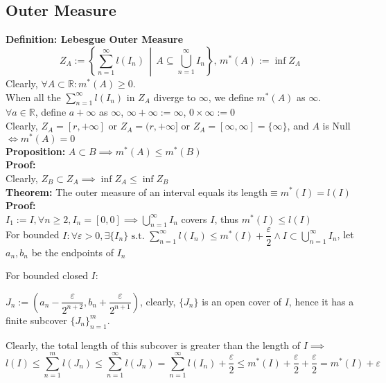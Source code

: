 \documentclass{article}
\newcommand{\R}{\mathbb{R}}
\newcommand{\sumninf}{\displaystyle\sum_{n=1}^\infty}
\newcommand{\infcup}{\displaystyle\bigcup_{n=1}^\infty}
\newcommand{\st}{\mbox{ s.t. }}
\newcommand{\0}{{\bf{0}}}
\newcommand{\1}{{\bf{1}}}
\begin{document}
\subsection{Outer Measure}
\textbf{Definition: Lebesgue Outer Measure}
$$Z_A:=\left\{\sum_{n=1}^\infty l(I_n)\,\middle\vert\,A\subseteq\bigcup_{n=1}^\infty I_n\right\},\,m^*(A):=\inf Z_A$$
Clearly, $\forall A\subset\R:m^*(A)\geq0$.\\
When all the $\sumninf l(I_n)$ in $Z_A$ diverge to $\infty$, we define $m^*(A)$ as $\infty$.\\
$\forall a\in\R$, define $a+\infty$ as $\infty$, $\infty+\infty:=\infty$, $0\times\infty:=0$\\
Clearly, $Z_A=[r,+\infty]$ or $Z_A=(r,+\infty]$ or $Z_A=[\infty,\infty]=\{\infty\}$, and $A$ is Null$\iff m^*(A)=0$\\
\textbf{Proposition:}
$A\subset B\implies m^*(A)\le m^*(B)$\\
\textbf{Proof:}\\
Clearly, $Z_B\subset Z_A\implies\inf Z_A\le\inf Z_B$\\
\textbf{Theorem:} The outer measure of an interval equals its length$\equiv m^*(I)=l(I)$\\
\textbf{Proof:}\\
$I_1:=I,\forall n\geq2,I_n=[0,0]\implies\displaystyle\bigcup_{n=1}^\infty I_n$ covers $I$, thus $m^*(I)\le l(I)$\\
For bounded $I:\forall\varepsilon>0,\exists\{I_n\}\st\sumninf l(I_n)\le m^*(I)+\dfrac{\varepsilon}{2}\land I\subset\infcup I_n$, let $a_n,b_n$ be the endpoints of $I_n$

For bounded closed $I$:

$J_n:=\left(a_n-\dfrac{\varepsilon}{2^{n+2}},b_n+\dfrac{\varepsilon}{2^{n+1}}\right)$, clearly, $\{J_n\}$ is an open cover of $I$, hence it has a finite subcover $\{J_n\}_{n=1}^m$.

Clearly, the total length of this subcover is greater than the length of $I\implies$\\
$$l(I)\le\displaystyle\sum_{n=1}^m l(J_n)\le\sumninf l(J_n)=\sumninf l(I_n)+\dfrac{\varepsilon}{2}\le m^*(I)+\dfrac{\varepsilon}{2}+\dfrac{\varepsilon}{2}=m^*(I)+\varepsilon$$
\end{document}
